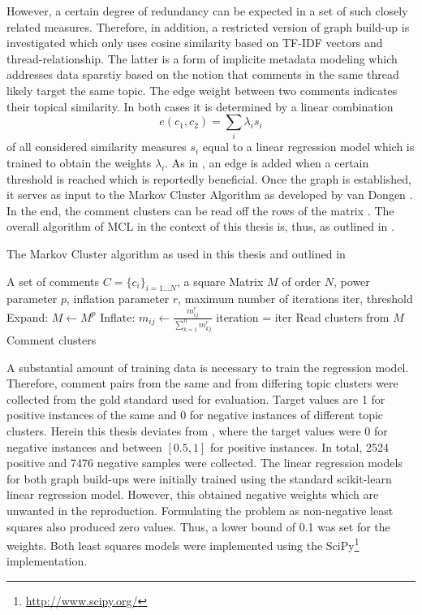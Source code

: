 However, a certain degree of redundancy can be expected in a set of such closely related measures.
Therefore, in addition, a restricted version of graph build-up is investigated which only uses cosine similarity based on TF-IDF vectors and thread-relationship. The latter is a form of implicite metadata modeling which addresses data sparstiy based on the notion that comments in the same thread likely target the same topic.
The edge weight between two comments indicates their topical similarity. In both cases it is determined by a linear combination \begin{equation}
e(c_1,c_2) = \sum_i \lambda_i s_i
\end{equation}
of all considered similarity measures $s_i$ equal to a linear regression model which is trained to obtain the weights $\lambda_i$. As in \cite{DBLP:conf/ecir/AkerKBPBHG16}, an edge is added when a certain threshold is reached which is reportedly beneficial.
Once the graph is established, it serves as input to the Markov Cluster Algorithm as developed by van Dongen \cite{vandongen00}. In the end, the comment clusters can be read off the rows of the matrix \cite{DBLP:conf/ecir/AkerKBPBHG16}.
The overall algorithm of MCL in the context of this thesis is, thus, as outlined in \cite{DBLP:conf/ecir/AkerKBPBHG16}.
\begin{algorithm}[H]
\label{mclalgthesis}
\caption{The Markov Cluster algorithm as used in this thesis and outlined in \cite{DBLP:conf/ecir/AkerKBPBHG16}}
\begin{algorithmic}
\REQUIRE A set of comments $C = \{c_i\}_{i=1...N}$, a square Matrix $M$ of order $N$, power parameter $p$, inflation parameter $r$, maximum number of iterations iter, threshold
\ELSE
{}
\ENDIF
\ENDFOR
\ENDFOR
\REPEAT
\STATE Expand: $M \leftarrow M^p$
\STATE Inflate: $m_{ij} \leftarrow \frac{m_{ij}^r}{\sum_{k=1}^n m_{kj}^r}$
\UNTIL iteration = iter
\STATE Read clusters from $M$
\RETURN Comment clusters
\end{algorithmic}
\end{algorithm}
A substantial amount of training data is necessary to train the regression model. Therefore, comment pairs from the same and from differing topic clusters were collected from the gold standard used for evaluation. Target values are 1 for positive instances of the same and 0 for negative instances of different topic clusters. Herein this thesis deviates from \cite{DBLP:conf/ecir/AkerKBPBHG16}, where the target values were 0 for negative instances and between $[0.5,1]$ for positive instances. In total, 2524 positive and 7476 negative samples were collected. The linear regression models for both graph build-ups were initially trained using the standard scikit-learn linear regression model. However, this obtained negative weights which are unwanted in the reproduction. Formulating the problem as non-negative least squares also produced zero values. Thus, a lower bound of 0.1 was set for the weights. Both least squares models were implemented using the SciPy\footnote{\url{http://www.scipy.org/}} \cite{scipy} implementation.
